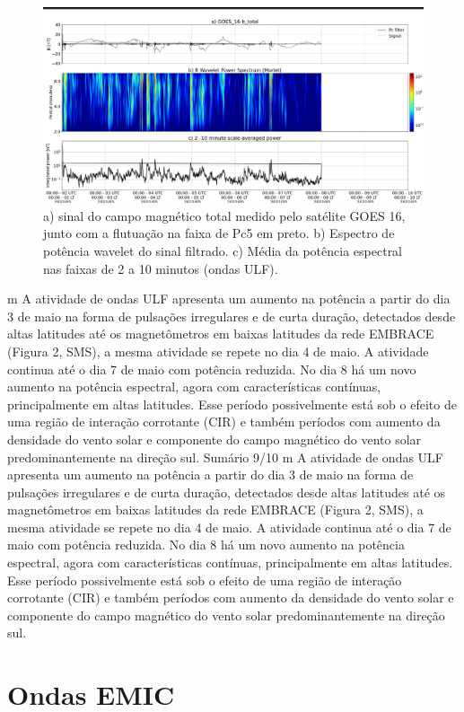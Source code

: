 \documentclass[11pt, oneside]{article}
\begin{document}
                     \begin{figure}[H]
    
                        \centering
   
                             \includegraphics[width=14cm]{./figures//figureULF_2.png}

                             \caption{a) sinal do campo magnético total medido pelo 
                              satélite GOES 16, junto com a flutuação na faixa de Pc5 
                              em preto. b) Espectro de potência wavelet do sinal 
                              filtrado. c) Média da potência espectral nas faixas 
                              de 2 a 10 minutos (ondas ULF).}
                        \end{figure}

                     m A atividade de ondas ULF apresenta um aumento na potência a partir do
dia 3 de maio na forma de pulsações irregulares e de curta duração,
detectados desde altas latitudes até os magnetômetros em baixas latitudes
da rede EMBRACE (Figura 2, SMS), a mesma atividade se repete no dia 4 de
maio. A atividade continua até o dia 7 de maio com potência reduzida. No
dia 8 há um novo aumento na potência espectral, agora com características
contínuas, principalmente em altas latitudes. Esse período possivelmente
está sob o efeito de uma região de interação corrotante (CIR) e também
períodos com aumento da densidade do vento solar e componente do
campo magnético do vento solar predominantemente na direção sul.
Sumário
9/10
m A atividade de ondas ULF apresenta um aumento na potência a partir do dia 3 de maio na forma de pulsações irregulares e de curta duração, detectados desde altas latitudes até os magnetômetros em baixas latitudes da rede EMBRACE (Figura 2, SMS), a mesma atividade se repete no dia 4 de maio. A atividade continua até o dia 7 de maio com potência reduzida. No dia 8 há um novo aumento na potência espectral, agora com características contínuas, principalmente em altas latitudes. Esse período possivelmente está sob o efeito de uma região de interação corrotante (CIR) e também períodos com aumento da densidade do vento solar e componente do campo magnético do vento solar predominantemente na direção sul.\section{Ondas EMIC} 
\end{document}
